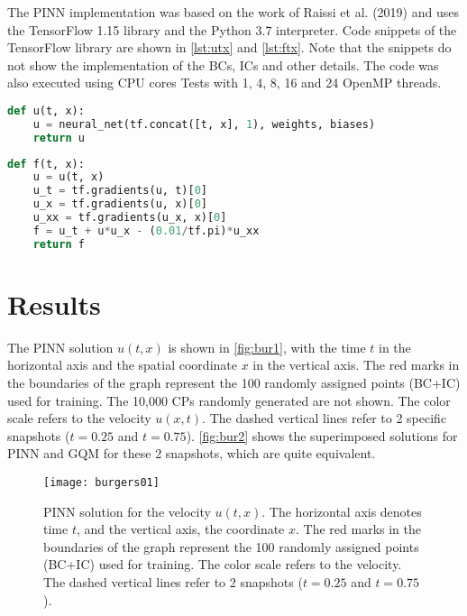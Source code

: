\documentclass[conference]{IEEEtran}
\begin{document}
The PINN implementation was based on the work of Raissi et al. (2019) \cite{Raissi2019} and uses 
the TensorFlow 1.15 library and the Python 3.7 interpreter. Code snippets of the TensorFlow library are shown in \autoref {lst:utx} and \autoref {lst:ftx}. Note that the snippets do not show the implementation of the BCs, ICs and other details. The code was also executed using CPU cores Tests with 1, 4, 8, 16 and 24 OpenMP threads.   

\begin{lstlisting}[language=Python, label=lst:utx, caption={Code snippet that implements $u(t,x)$}]
def u(t, x):
    u = neural_net(tf.concat([t, x], 1), weights, biases)
    return u
\end{lstlisting}

\begin{lstlisting}[language=Python, label=lst:ftx, caption={Code snippet that implements $f(t,x)$}]
def f(t, x):
    u = u(t, x)
    u_t = tf.gradients(u, t)[0]
    u_x = tf.gradients(u, x)[0]
    u_xx = tf.gradients(u_x, x)[0]
    f = u_t + u*u_x - (0.01/tf.pi)*u_xx
    return f
\end{lstlisting}

%
\section{Results}\label{sec:resu}

The PINN solution $u(t,x)$ is shown in \autoref{fig:bur1}, with the time $t$ in the horizontal axis  and the spatial coordinate $x$ in the vertical axis. The red marks in the boundaries of the graph represent the 100 randomly assigned points (BC+IC) used for training. The 10,000 CPs randomly generated are not shown. The color scale refers to the velocity $u(x,t)$. The dashed vertical lines refer to 2 specific snapshots ($t=0.25$ and $t=0.75$). \autoref {fig:bur2} shows the superimposed solutions for PINN and GQM for these 2 snapshots, which are quite equivalent.

\begin{figure}[htb]
\centering
\texttt{[image: burgers01]}
\caption{PINN solution for the velocity $u(t,x)$. The horizontal axis denotes time $t$, and the vertical axis, the coordinate $x$. The red marks in the boundaries of the graph represent the 100 randomly assigned points (BC+IC) used for training. The color scale refers to the velocity. The dashed vertical lines refer to 2 snapshots ($t=0.25$ and $t=0.75$).} 
\label{fig:bur1}
\end{figure}
\end{document}
